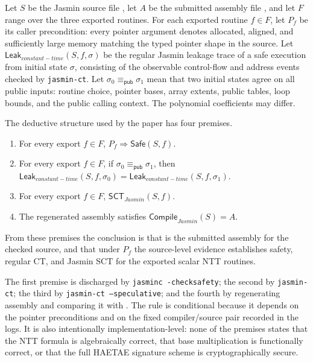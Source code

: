 \documentclass[10pt,twocolumn]{article}
\newcommand{\haetae}{HAETAE}
\newcommand{\jasmin}{Jasmin}
\newcommand{\ct}{constant-time}
\begin{document}
Let \(S\) be the \jasmin{} source file , let \(A\)
be the submitted assembly file , and let \(F\) range over the
three exported routines.  For each exported routine \(f\in F\), let \(P_f\) be
its caller precondition: every pointer argument denotes allocated, aligned, and
sufficiently large memory matching the typed pointer shape in the source.  Let
\(\mathsf{Leak}_{\ct{}}(S,f,\sigma)\) be the regular Jasmin leakage trace of a
safe execution from initial state \(\sigma\), consisting of the observable
control-flow and address events checked by \texttt{jasmin-ct}.  Let
\(\sigma_0\equiv_{\mathsf{pub}}\sigma_1\) mean that two initial states agree on
all public inputs: routine choice, pointer bases, array extents, public tables,
loop bounds, and the public calling context.  The polynomial coefficients may
differ.

The deductive structure used by the paper has four premises.
\begin{enumerate}
  \item For every export \(f\in F\), \(P_f\Rightarrow
  \mathsf{Safe}(S,f)\).
  \item For every export \(f\in F\), if
  \(\sigma_0\equiv_{\mathsf{pub}}\sigma_1\), then
  \(\mathsf{Leak}_{\ct{}}(S,f,\sigma_0)=
  \mathsf{Leak}_{\ct{}}(S,f,\sigma_1)\).
  \item For every export \(f\in F\), \(\mathsf{SCT}_{\jasmin}(S,f)\).
  \item The regenerated assembly satisfies \(\mathsf{Compile}_{\jasmin}(S)=A\).
\end{enumerate}
From these premises the conclusion is that  is the submitted
assembly for the checked source, and that under \(P_f\) the source-level
evidence establishes safety, regular CT, and Jasmin SCT for the exported scalar
NTT routines.

The first premise is discharged by \texttt{jasminc -checksafety}; the second by
\texttt{jasmin-ct}; the third by \texttt{jasmin-ct --speculative}; and the
fourth by regenerating assembly and comparing it with .  The rule
is conditional because it depends on the pointer preconditions and on the fixed
compiler/source pair recorded in the logs.  It is also intentionally
implementation-level: none of the premises states that the NTT formula is
algebraically correct, that base multiplication is functionally correct, or
that the full \haetae{} signature scheme is cryptographically secure.
\end{document}
